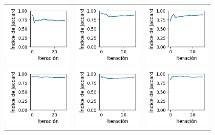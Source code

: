 \begin{figure}[!b]
    \centering
    \begin{tabular}{ccc}
        \includegraphics[width=4.5cm]{../Plots/score_epoch_0.png} &
        \includegraphics[width=4.5cm]{../Plots/score_epoch_1.png} &
        \includegraphics[width=4.5cm]{../Plots/score_epoch_2.png} \\

        \includegraphics[width=4.5cm]{../Plots/score_epoch_3.png} &
        \includegraphics[width=4.5cm]{../Plots/score_epoch_4.png} &
        \includegraphics[width=4.5cm]{../Plots/score_epoch_5.png} \\


\end{tabular}
\end{figure}

